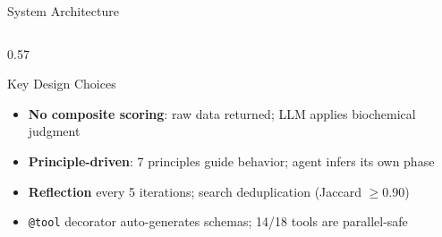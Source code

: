 \documentclass[aspectratio=169, 11pt]{beamer}
\begin{document}
\begin{frame}{System Architecture}
\begin{columns}[T]
\begin{column}{0.57\textwidth}
\begin{exampleblock}{\small Key Design Choices}
\vspace{-2pt}
\begin{itemize}\scriptsize
\setlength\itemsep{0pt}
\item \textbf{No composite scoring}: raw data returned; LLM applies biochemical judgment
\item \textbf{Principle-driven}: 7 principles guide behavior; agent infers its own phase
\item \textbf{Reflection} every 5 iterations; search deduplication (Jaccard $\geq$0.90)
\item \texttt{@tool} decorator auto-generates schemas; 14/18 tools are parallel-safe
\end{itemize}
\vspace{-2pt}
\end{exampleblock}

\end{column}
\end{columns}
\end{frame}
\end{document}
